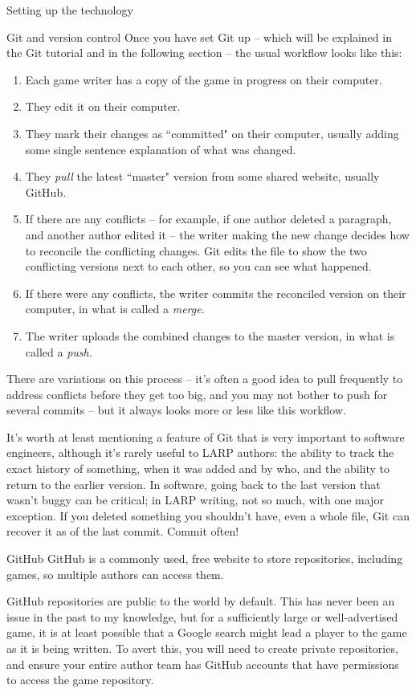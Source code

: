 \documentclass[sheet]{GameTexBase}
\begin{document}
\begin{section}{Setting up the technology}
\begin{subsection}{Git and version control}
Once you have set Git up -- which will be explained in the Git tutorial and in the following section -- the usual workflow looks like this:
\begin{enumerate}
\item Each game writer has a copy of the game in progress on their computer.
\item They edit it on their computer.
\item They mark their changes as ``committed" on their computer, usually adding some single sentence explanation of what was changed.
\item They \textit{pull} the latest ``master" version from some shared website, usually GitHub.  
\item If there are any conflicts – for example, if one author deleted a paragraph, and another author edited it – the writer making the new change decides how to reconcile the conflicting changes.  Git edits the file to show the two conflicting versions next to each other, so you can see what happened.
\item If there were any conflicts, the writer commits the reconciled version on their computer, in what is called a \textit{merge}.
\item The writer uploads the combined changes to the master version, in what is called a \textit{push}.
\end{enumerate}

There are variations on this process -- it's often a good idea to pull frequently to address conflicts before they get too big, and you may not bother to push for several commits -- but it always looks more or less like this workflow.

It's worth at least mentioning a feature of Git that is very important to software engineers, although it's rarely useful to LARP authors: the ability to track the exact history of something, when it was added and by who, and the ability to return to the earlier version.  In software, going back to the last version that wasn't buggy can be critical; in LARP writing, not so much, with one major exception.  If you deleted something you shouldn't have, even a whole file, Git can recover it as of the last commit.  Commit often!

\begin{subsubsection}{GitHub}
GitHub is a commonly used, free website to store repositories, including games, so multiple authors can access them.

GitHub repositories are public to the world by default.  This has never been an issue in the past to my knowledge, but for a sufficiently large or well-advertised game, it is at least possible that a Google search might lead a player to the game as it is being written.  To avert this, you will need to create private repositories, and ensure your entire author team has GitHub accounts that have permissions to access the game repository.


\end{subsubsection}
\end{subsection}
\end{section}
\end{document}
